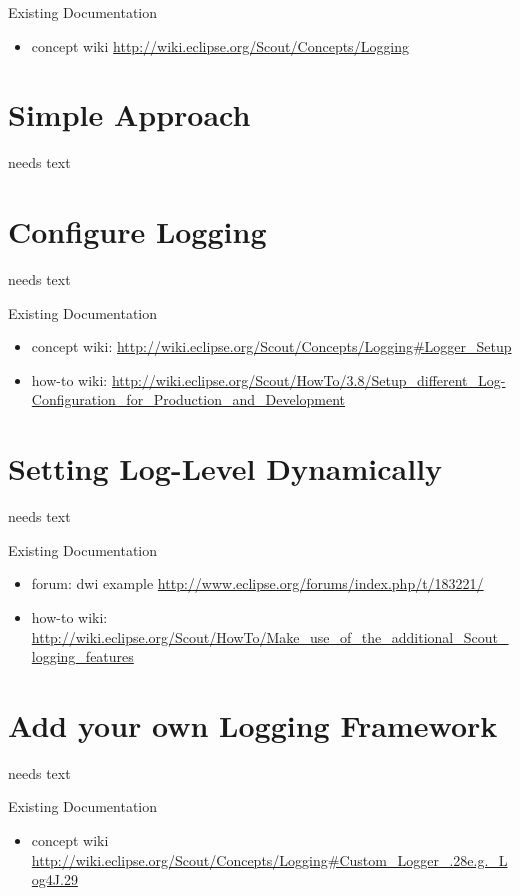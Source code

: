 \documentclass[a4paper,10pt,twoside]{book}
\begin{document}
\noindent Existing Documentation
\begin{itemize}
  \item concept wiki \url{http://wiki.eclipse.org/Scout/Concepts/Logging}
\end{itemize}

\section{Simple Approach}
needs text
  
\section{Configure Logging}
needs text

\noindent Existing Documentation
\begin{itemize}
  \item concept wiki: \url{http://wiki.eclipse.org/Scout/Concepts/Logging#Logger_Setup}
  \item how-to wiki: \url{http://wiki.eclipse.org/Scout/HowTo/3.8/Setup_different_Log-Configuration_for_Production_and_Development}
\end{itemize}

\section{Setting Log-Level Dynamically}
needs text

\noindent Existing Documentation
\begin{itemize}
  \item forum: dwi example \url{http://www.eclipse.org/forums/index.php/t/183221/}
  \item how-to wiki: \url{http://wiki.eclipse.org/Scout/HowTo/Make_use_of_the_additional_Scout_logging_features}
\end{itemize}

\section{Add your own Logging Framework}
needs text

\noindent Existing Documentation
\begin{itemize}
  \item concept wiki \url{http://wiki.eclipse.org/Scout/Concepts/Logging#Custom_Logger_.28e.g._Log4J.29}
\end{itemize}
\end{document}
